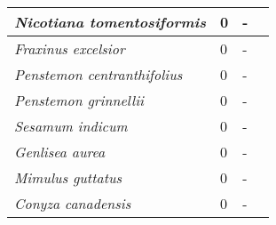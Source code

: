 {\begin{longtable}{| L{4cm} | L{2cm}  | L{5cm} | L{4cm} |}
\textit{Nicotiana tomentosiformis} & 0 & - & \\ \hline
\textit{Fraxinus excelsior} & 0 & - & \\ \hline
\textit{Penstemon centranthifolius} & 0 & - & \\ \hline
\textit{Penstemon grinnellii} & 0 & - & \\ \hline
\textit{Sesamum indicum} & 0 & - & \\ \hline
\textit{Genlisea aurea} & 0 & - & \\ \hline
\textit{Mimulus guttatus} & 0 & - & \\ \hline
\textit{Conyza canadensis} & 0 & - & \\ \hline		
		
\end{longtable}}

\clearpage